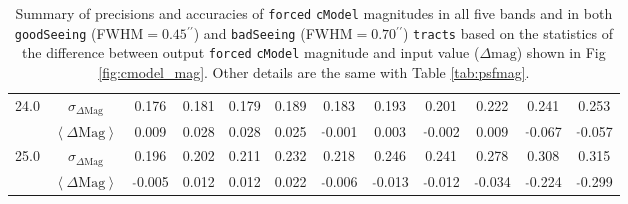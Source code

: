 \documentclass[useamsfonts]{pasj01}
\def\asec{$^{\prime\prime}$}
\def\cmodel{\texttt{cModel}}
\def\forced{\texttt{forced}}
\def\tracts{\texttt{tracts}}
\newcommand{\minus}{\raisebox{.4\height}{\scalebox{.8}{-}}}
\newcommand{\smag}{$\sigma_{\Delta\mathrm{Mag}}$}
\newcommand{\mmag}{$\left<{\Delta\mathrm{Mag}}\right>$}
\newcommand{\n}{$\minus$}
\begin{document}
\begin{table}
\begin{center}
\begin{tabular}{| c | c | c | c | c | c | c | c | c | c | c | c |}
    \rowcolor[gray]{.85} 24.0 & \smag{} & 0.176 & 0.181  & 0.179 & 0.189 &   0.183 & 0.193 &   0.201 & 0.222 &   0.241 &   0.253 \\
    \rowcolor[gray]{.85}      & \mmag{} & 0.009 & 0.028  & 0.028 & 0.025 & \n0.001 & 0.003 & \n0.002 & 0.009 & \n0.067 & \n0.057 \\
    \hline 
    
    \rowcolor[gray]{1.0} 25.0 & \smag{} &   0.196 & 0.202  & 0.211 & 0.232 &   0.218 &   0.246 &   0.241 &   0.278 &   0.308 &   0.315 \\
    \rowcolor[gray]{1.0}      & \mmag{} & \n0.005 & 0.012  & 0.012 & 0.022 & \n0.006 & \n0.013 & \n0.012 & \n0.034 & \n0.224 & \n0.299 \\
    \hline
        
    \end{tabular}

    \end{center}
    \caption{
        Summary of precisions and accuracies of \forced{} \cmodel{} magnitudes in all 
        five bands and in both \texttt{goodSeeing} (FWHM$=0.45$\asec{}) and
        \texttt{badSeeing} (FWHM$=0.70$\asec{}) \tracts{} based on the statistics of 
        the difference between output \forced{} \cmodel{} magnitude and input 
        value ($\Delta\mathrm{mag}$) shown in Fig \ref{fig:cmodel_mag}.
        Other details are the same with Table \ref{tab:psfmag}.}
        \label{tab:cmodelmag}
\end{table}
\end{document}
